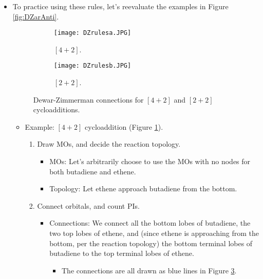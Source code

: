 \documentclass[../notes.tex]{subfiles}
\begin{document}
\begin{itemize}
\begin{enumerate}
\begin{itemize}
        \end{itemize}
    \end{enumerate}
    \pagebreak
    \item To practice using these rules, let's reevaluate the examples in Figure \ref{fig:DZarAnti}.
    \begin{figure}[h!]
        \centering
        \begin{subfigure}[b]{0.17\linewidth}
            \centering
            \texttt{[image: DZrulesa.JPG]}
            \caption{$[4+2]$.}
            \label{fig:DZrulesa}
        \end{subfigure}
        \begin{subfigure}[b]{0.17\linewidth}
            \centering
            \texttt{[image: DZrulesb.JPG]}
            \caption{$[2+2]$.}
            \label{fig:DZrulesb}
        \end{subfigure}
        \caption{Dewar-Zimmerman connections for $[4+2]$ and $[2+2]$ cycloadditions.}
        \label{fig:DZrules}
    \end{figure}
    \begin{itemize}
        \item Example: $[4+2]$ cycloaddition (Figure \ref{fig:DZrulesa}).
        \begin{enumerate}
            \item Draw MOs, and decide the reaction topology.
            \begin{itemize}
                \item MOs: Let's arbitrarily choose to use the MOs with no nodes for both butadiene and ethene.
                \item Topology: Let ethene approach butadiene from the bottom.
            \end{itemize}
            \item Connect orbitals, and count PIs.
            \begin{itemize}
                \item Connections: We connect all the bottom lobes of butadiene, the two top lobes of ethene, and (since ethene is approaching from the bottom, per the reaction topology) the bottom terminal lobes of butadiene to the top terminal lobes of ethene.
                \begin{itemize}
                    \item The connections are all drawn as blue lines in Figure \ref{fig:DZrules}.
                \end{itemize}

\end{itemize}
\end{enumerate}
\end{itemize}
\end{itemize}
\end{document}
